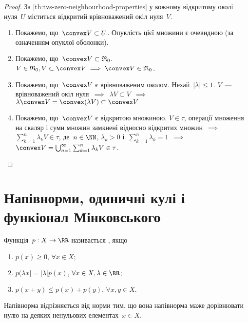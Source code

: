 \begin{proof}
    За \cref{th:tvs-zero-neighbourhood-properties} у кожному відкритому околі нуля~$U$ міститься відкритий врівноважений окіл нуля~$V$.
    
    \begin{enumerate}
        \item Покажемо, що~$\convex V \subset U$. Опуклість цієї множини є очевидною (за означенням опуклої оболонки).

        \item Покажемо, що~$\convex V \subset \frak R_0$. $V \in \frak R_0, V \subset \convex V \implies \convex V \in \frak R_0$.

        \item Покажемо, що~$\convex V$ є врівноваженим околом. Нехай~$|\lambda| \le 1$. $V$~--- врівноважений окіл нуля~$\implies$~$\lambda V \subset V$~$\implies$~$\lambda \convex V = \convex (\lambda V) \subset \convex V$

        \item Покажемо, що~$\convex V$ є відкритою множиною. $V \in \tau$, операції множення на скаляр і суми множин замкнені відносно відкритих множин~$\implies$~$\sum_{k = 1}^n \lambda_k V \in \tau$, де~$n \in \NN$, $\lambda_k > 0$ і~$\sum_{k = 1}^n \lambda_k = 1$~$\implies$~$\convex V = \bigcup_{n = 1}^\infty \sum_{k = 1}^n \lambda_k V \in \tau$. \qedhere
    \end{enumerate}
\end{proof}

\section{Напівнорми, одиничні кулі і функіонал Мінковського}

\begin{definition}
    Функція~$p: X \to \RR$ називається , якщо
    \begin{enumerate}
        \item $p(x) \ge 0$, $\forall x \in X$;
        \item $p(\lambda x| = |\lambda| p(x)$, $\forall x \in X, \lambda \in \RR$;
        \item $p(x + y) \le p(x) + p(y)$, $\forall x, y \in X$.
    \end{enumerate}
\end{definition}

\begin{remark}
    Напівнорма відрізняється від норми тим, що вона напівнорма маже дорівнювати нулю на деяких ненульових елементах~$x \in X$.
\end{remark}


